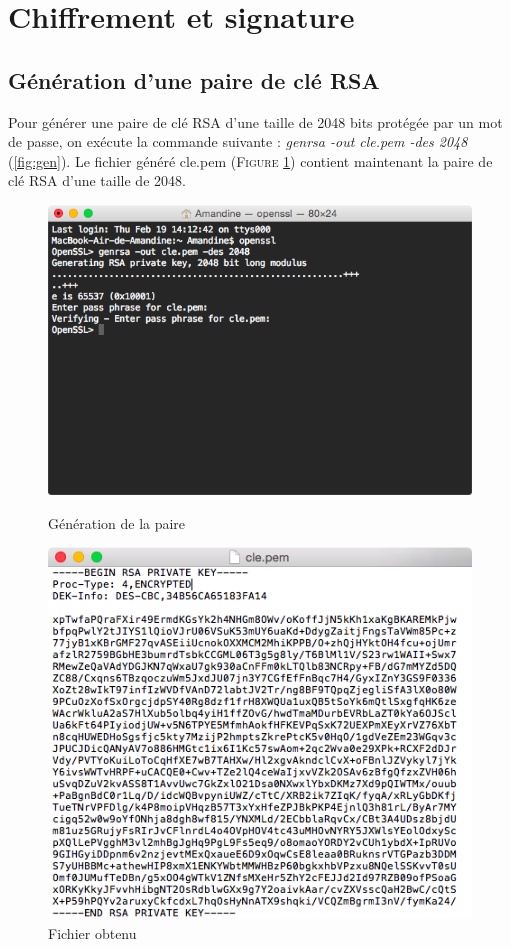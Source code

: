 \documentclass[11pt]{article}
\begin{document}
\section{Chiffrement et signature}
\subsection{Génération d'une paire de clé RSA}
Pour générer une paire de clé RSA d'une taille de 2048 bits protégée par un mot de passe, on exécute la commande suivante : \textit{genrsa -out cle.pem -des 2048} (\ref{fig:gen}). Le fichier généré cle.pem (\textsc{Figure \ref{fig:cle}}) contient maintenant la paire de clé RSA d'une taille de 2048.
\begin{figure}[hbtp]
    \begin{minipage}[b]{0.4\linewidth}
        \centering \includegraphics[scale=0.4]{Capture/question1.png}
        \caption{Génération de la paire}
                \label{fig:gen}
\label{fig:base}
    \end{minipage}\hfill
    \begin{minipage}[b]{0.48\linewidth}
        \centering \includegraphics[scale=0.4]{Capture/question1b.png}
        \caption{Fichier obtenu}
         \label{fig:cle}
    \end{minipage}
\end{figure}
\end{document}
